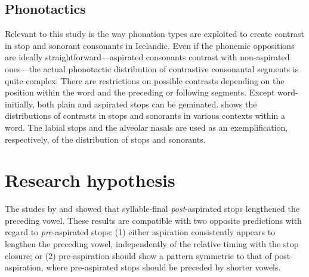 \documentclass[11pt,a4paper,oneside,openany]{memoir}\usepackage[]{graphicx}\usepackage[]{color}
\begin{document}
\subsection{Phonotactics}


Relevant to this study is the way phonation types are exploited to create contrast in stop and sonorant consonants in Icelandic.
Even if the phonemic oppositions are ideally straightforward---aspirated consonants contrast with non-aspirated ones---the actual phonotactic distribution of contrastive consonantal segments is quite complex.
There are restrictions on possible contrasts depending on the position within the word and the preceding or following segments. Except word-initially, both plain and aspirated stops can be geminated.
 shows the distributions of contrasts in stops and sonorants in various contexts within a word.
The labial stops and the alveolar nasals are used as an exemplification, respectively, of the distribution of stops and sonorants.


\section{Research hypothesis}
\label{s:hypothesis}

The studes by \citet{maddieson1976} and \citet{durvasula2012} showed that syllable-final \textit{post}-aspirated stops lengthened the preceding vowel.
These results are compatible with two opposite predictions with regard to \textit{pre}-aspirated stops: (1) either aspiration consistently appears to lengthen the preceding vowel, independently of the relative timing with the stop closure; or (2) pre-aspiration should show a pattern symmetric to that of post-aspiration, where pre-aspirated stops should be preceded by shorter vowels.
\end{document}
